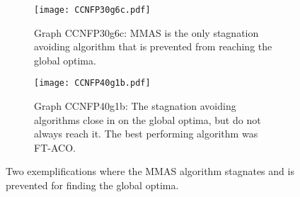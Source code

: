 \begin{figure}[htp] %
\graphicspath{{chapters/chapter5/images/graphs/}}
\centering

\begin{subfigure}[t]{0.8\textwidth}
  \centering
  \texttt{[image: CCNFP30g6c.pdf]}
  \caption{Graph CCNFP30g6c: MMAS is the only stagnation avoiding algorithm that is prevented from reaching the global optima.}\label{fig:mmas_stagnation_fig1}
\end{subfigure}

\begin{subfigure}[t]{0.8\textwidth}
  \centering
  \texttt{[image: CCNFP40g1b.pdf]}
  \caption{Graph CCNFP40g1b: The stagnation avoiding algorithms close in on the global optima, but do not always reach it. The best performing algorithm was FT-ACO.}\label{fig:mmas_stagnation_fig2}
\end{subfigure}

\caption{Two exemplifications where the MMAS algorithm stagnates and is prevented for finding the global optima.}\label{fig:mmas_stagnation}
\end{figure}